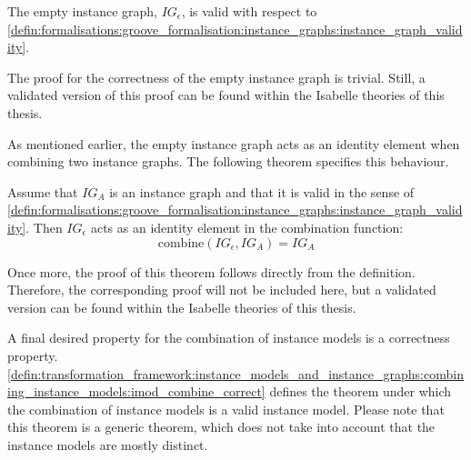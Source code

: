 \begin{thm}
\label{defin:transformation_framework:instance_models_and_instance_graphs:combining_instance_graphs:ig_empty_correct}
The empty instance graph, $IG_{\epsilon}$, is valid with respect to
\cref{defin:formalisations:groove_formalisation:instance_graphs:instance_graph_validity}.
\end{thm}

The proof for the correctness of the empty instance graph is trivial. Still, a validated version of this proof can be found within the Isabelle theories of this thesis.

As mentioned earlier, the empty instance graph acts as an identity element when combining two instance graphs. The following theorem specifies this behaviour.

\begin{thm}
\label{defin:transformation_framework:instance_models_and_instance_graphs:combining_instance_graphs:ig_combine_identity}
Assume that $IG_A$ is an instance graph and that it is valid in the sense of \cref{defin:formalisations:groove_formalisation:instance_graphs:instance_graph_validity}. Then $IG_{\epsilon}$ acts as an identity element in the combination function:
\begin{equation*}
    \mathrm{combine}(IG_{\epsilon}, IG_A) = IG_A
\end{equation*}
\end{thm}

Once more, the proof of this theorem follows directly from the definition. Therefore, the corresponding proof will not be included here, but a validated version can be found within the Isabelle theories of this thesis.

A final desired property for the combination of instance models is a correctness property. \cref{defin:transformation_framework:instance_models_and_instance_graphs:combining_instance_models:imod_combine_correct} defines the theorem under which the combination of instance models is a valid instance model. Please note that this theorem is a generic theorem, which does not take into account that the instance models are mostly distinct.

